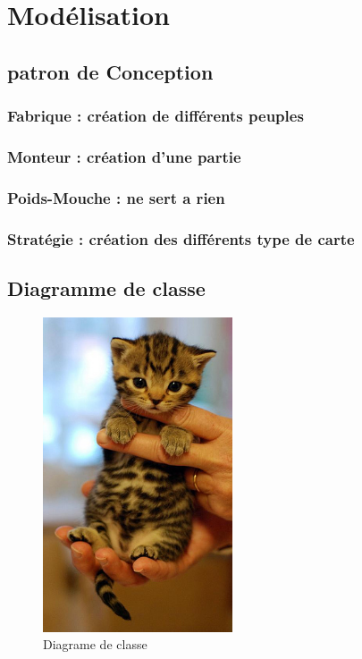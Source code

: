 \section{Modélisation}
	\subsection{patron de Conception}
		\subsubsection{Fabrique : création de différents peuples}
		\subsubsection{Monteur : création d'une partie}
		\subsubsection{Poids-Mouche : ne sert a rien}
		\subsubsection{Stratégie : création des différents type de carte}

	\subsection{Diagramme de classe}


	\begin{figure}
		\begin{center}
			\includegraphics[width=0.5\textwidth]{figure/diagramme_de_classe.png}
		\end{center}
		\caption{Diagrame de classe}
		\label{fig:planif}
	\end{figure}




